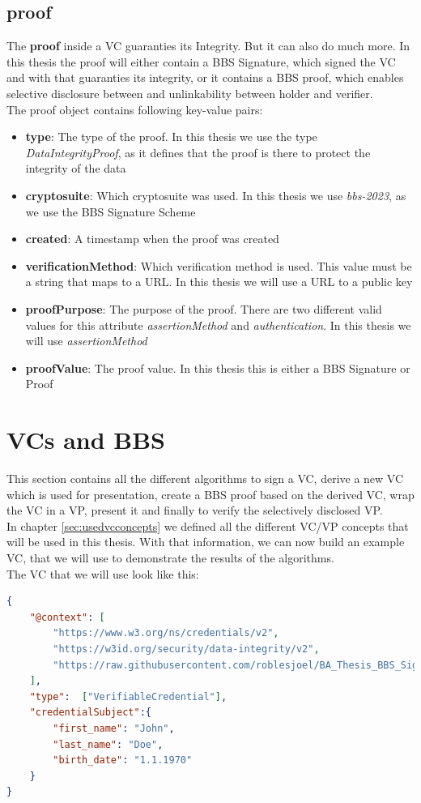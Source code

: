 \documentclass[
	a4paper               %
	,BCOR=0mm            %
	,bibliography=totoc   %
	,listof=totoc         %
	,monolingual
	,twoside=false
]{bfhthesis}              %
\begin{document}
\subsection{proof}
The \textbf{proof} inside a VC guaranties its Integrity. But it can also do much more.
In this thesis the proof will either contain a BBS Signature, which signed the VC and with that guaranties its integrity, or it contains a BBS proof, which enables selective disclosure between and unlinkability between holder and verifier.\\
The proof object contains following key-value pairs:
\begin{itemize}
	\item \textbf{type}: The type of the proof. In this thesis we use the type \textit{DataIntegrityProof}, as it defines that the proof is there to protect the integrity of the data
	\item \textbf{cryptosuite}: Which cryptosuite was used. In this thesis we use \textit{bbs-2023}, as we use the BBS Signature Scheme
	\item \textbf{created}: A timestamp when the proof was created
	\item \textbf{verificationMethod}: Which verification method is used. This value must be a string that maps to a URL. In this thesis we will use a URL to a public key
	\item \textbf{proofPurpose}: The purpose of the proof. There are two different valid values for this attribute \textit{assertionMethod} and \textit{authentication}. In this thesis we will use \textit{assertionMethod}
	\item \textbf{proofValue}: The proof value. In this thesis this is either a BBS Signature or Proof
\end{itemize}

\section{VCs and BBS}
This section contains all the different algorithms to sign a VC, derive a new VC which is used for presentation, create a BBS proof based on the derived VC, wrap the VC in a VP, present it and finally to verify the selectively disclosed VP.\\

In chapter \ref{sec:usedvcconcepts} we defined all the different VC/VP concepts that will be used in this thesis. With that information, we can now build an example VC, that we will use to demonstrate the results of the algorithms.\\
The VC that we will use look like this:
\begin{lstlisting}[language=json,firstnumber=1,caption={Example VC},captionpos=b,label={list:example-vc}]
{
	"@context": [
		"https://www.w3.org/ns/credentials/v2",
		"https://w3id.org/security/data-integrity/v2",
		"https://raw.githubusercontent.com/roblesjoel/BA_Thesis_BBS_Signatures/docs/context/example_1.jsonld"
	],
	"type":  ["VerifiableCredential"],
	"credentialSubject":{
		"first_name": "John",
		"last_name": "Doe",
		"birth_date": "1.1.1970"
	}
}
\end{lstlisting}
\end{document}

